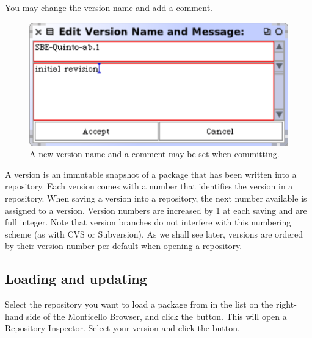 \documentclass[a4paper,10pt,twoside]{book}
\begin{document}

You may change the version name and add a comment. 

\begin{figure}[ht]\centering
	\includegraphics[width=.55\linewidth]{saving.png}
	\caption{A new version name and a comment may be set when committing.}
\end{figure}

A version is an immutable snapshot of a package that has been written into a repository. Each version comes with a number that identifies the version in a repository. When saving a version into a repository, the next number available is assigned to a version. Version numbers are increased by 1 at each saving and are full integer. Note that version branches do not interfere with this numbering scheme (as with CVS or Subversion). As we shall see later, versions are ordered by their version number per default when opening a repository.


\subsection{Loading and updating}

Select the repository you want to load a package from in the list on the right-hand side of the Monticello Browser, and click the  button. This will open a Repository Inspector. Select your version and click the  button.
\end{document}
